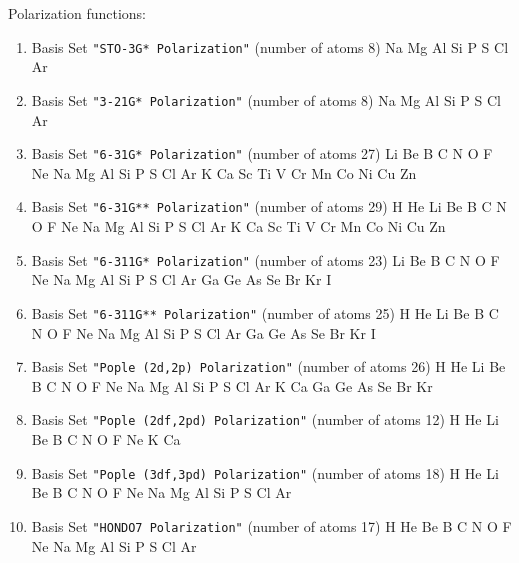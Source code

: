 Polarization functions:

\begin{enumerate}

\item Basis Set \verb#"STO-3G* Polarization"# (number of atoms 8)  \newline
  Na Mg Al Si P S Cl Ar


\item Basis Set \verb#"3-21G* Polarization"# (number of atoms 8)  \newline
  Na Mg Al Si P S Cl Ar


\item Basis Set \verb#"6-31G* Polarization"# (number of atoms 27)  \newline
  Li Be B C N O F Ne Na Mg Al Si P S Cl Ar K Ca Sc Ti V Cr Mn Co Ni
 Cu Zn


\item Basis Set \verb#"6-31G** Polarization"# (number of atoms 29)  \newline
  H He Li Be B C N O F Ne Na Mg Al Si P S Cl Ar K Ca Sc Ti V Cr Mn
 Co Ni Cu Zn


\item Basis Set \verb#"6-311G* Polarization"# (number of atoms 23)  \newline
  Li Be B C N O F Ne Na Mg Al Si P S Cl Ar Ga Ge As Se Br Kr I


\item Basis Set \verb#"6-311G** Polarization"# (number of atoms 25)  \newline
  H He Li Be B C N O F Ne Na Mg Al Si P S Cl Ar Ga Ge As Se Br Kr I


\item Basis Set \verb#"Pople (2d,2p) Polarization"# (number of atoms 26)  \newline
  H He Li Be B C N O F Ne Na Mg Al Si P S Cl Ar K Ca Ga Ge As Se Br
 Kr

\item Basis Set \verb#"Pople (2df,2pd) Polarization"# (number of atoms 12)  \newline
  H He Li Be B C N O F Ne K Ca


\item Basis Set \verb#"Pople (3df,3pd) Polarization"# (number of atoms 18)  \newline
  H He Li Be B C N O F Ne Na Mg Al Si P S Cl Ar

\item Basis Set \verb#"HONDO7 Polarization"# (number of atoms 17)  \newline
  H He Be B C N O F Ne Na Mg Al Si P S Cl Ar


\end{enumerate}

